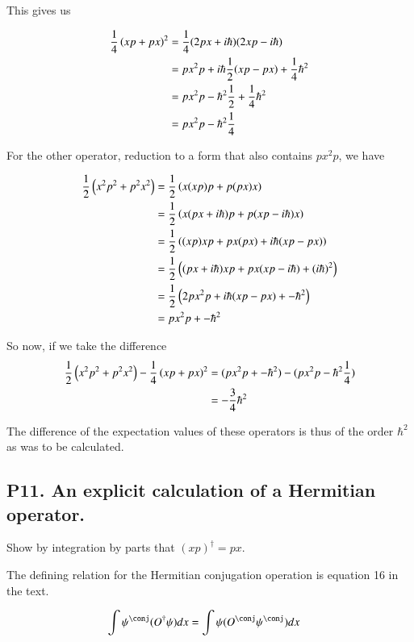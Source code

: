 This gives us

\begin{align*}
\frac{1}{4}\left(x p + p x \right)^2 
&= \frac{1}{4}(2 p x + i \hbar)( 2 x p - i \hbar ) \\
&= p x^2 p + i\hbar \frac{1}{2}(x p - p x) + \frac{1}{4} \hbar^2 \\
&= p x^2 p - \hbar^2 \frac{1}{2} + \frac{1}{4} \hbar^2 \\
&= p x^2 p - \hbar^2 \frac{1}{4} \\
\end{align*}

For the other operator, reduction to a form that also contains $p x^2 p$, we have

\begin{align*}
\frac{1}{2}\left(x^2 p^2 + p^2 x^2 \right)
&=
\frac{1}{2}\left(x (x p) p + p (p x) x \right) \\
&=
\frac{1}{2}\left(x (p x + i \hbar) p + p (x p -i\hbar) x \right) \\
&=
\frac{1}{2}\left((x p) x p + p x (p x) + i \hbar ( x p - p x ) \right) \\
&=
\frac{1}{2}\left((p x + i\hbar) x p + p x ( x p - i\hbar) + (i \hbar)^2 \right) \\
&=
\frac{1}{2}\left( 2 p x^2 p + i \hbar ( x p - p x) + -\hbar^2 \right) \\
&=
p x^2 p + -\hbar^2 
\end{align*}

So now, if we take the difference 
\begin{align*}
\frac{1}{2}\left(x^2 p^2 + p^2 x^2 \right) - \frac{1}{4}\left(x p + p x \right)^2 
&= (p x^2 p + -\hbar^2 ) - (p x^2 p - \hbar^2 \frac{1}{4}) 
 \\
&= -\frac{3}{4}\hbar^2 
 \\
\end{align*}

The difference of the expectation values of these operators is thus of the order $\hbar^2$ as was to be calculated.

\subsection{P11.  An explicit calculation of a Hermitian operator. }

Show by integration by parts that $(xp)^\dagger = p x$.

The defining relation for the Hermitian conjugation operation is equation 16 in the text.

\begin{align*}
\int \psi^\conj (O^\dagger \psi) dx &= \int \psi (O^\conj \psi^\conj) dx
\end{align*}

